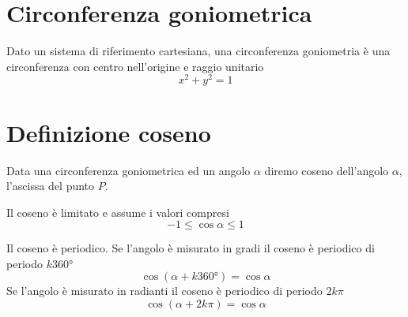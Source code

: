 \section{Circonferenza goniometrica}\label{sec:circonferenza-goniometrica}
\begin{defn}\label{defn:Circoferenza-Gonimetrica}
Dato un sistema di riferimento cartesiana, una circonferenza goniometria è una circonferenza con centro nell'origine e raggio unitario
\begin{equation*}
x^2+y^2=1
\end{equation*}
\end{defn}
\section{Definizione coseno}\label{sec:definizione-coseno}
\begin{defn}[Coseno]\label{defn:coseno1}
Data una circonferenza goniometrica ed un angolo $\alpha$ diremo coseno dell'angolo $\alpha$, l'ascissa del punto $P$.
\end{defn}
{\centering
	
	\par}
\begin{prop}\label{prop:Cosenolimitato}
Il coseno è limitato
e assume i valori compresi
\begin{equation*}
-1\leq \cos\alpha \leq 1
\end{equation*}
\end{prop}

\begin{prop}\label{Prop:periodocoseno}
Il coseno è periodico. 
Se l'angolo è misurato in gradi il coseno è periodico di periodo $k\ang{360}$
\begin{equation*}
\cos(\alpha+k\ang{360;;})=\cos\alpha
\end{equation*}
Se l'angolo è misurato in radianti il coseno è periodico di periodo $2k\pi$
\begin{equation*}
\cos(\alpha+2k\pi)=\cos\alpha
\end{equation*}
\end{prop}
